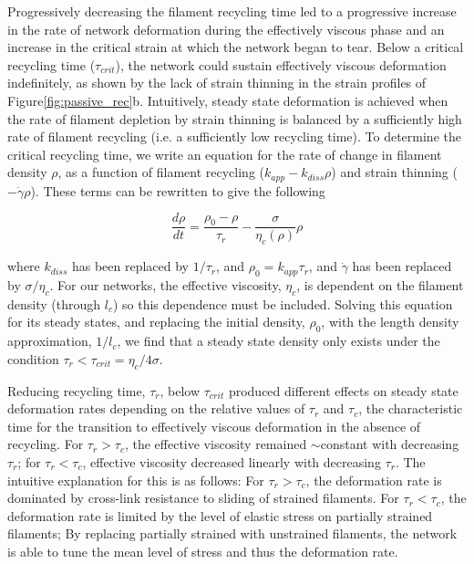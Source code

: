 \documentclass[10pt,letterpaper]{article}
\begin{document}
Progressively decreasing the filament recycling time led to a progressive increase in the rate of network deformation during the effectively viscous phase and an increase in the critical strain at which the network began to tear. Below a critical recycling time ($\tau_{crit}$), the network could sustain effectively viscous deformation indefinitely, as shown by the lack of strain thinning in the strain profiles of Figure\ref{fig:passive_rec}b. Intuitively, steady state deformation is achieved when the rate of filament depletion by strain thinning is balanced by a sufficiently high rate of filament recycling (i.e. a sufficiently low recycling time).  To determine the critical recycling time, we write an equation for the rate of change in filament density $\rho$, as a function of filament recycling ($k_{app}-k_{diss}\rho$) and strain thinning ($-\dot{\gamma}\rho$).
These terms can be rewritten to give the following 

\begin{equation}
\frac{d \rho}{dt} = \frac{\rho_0-\rho}{\tau_r}  - \frac{\sigma}{\eta_c(\rho)} \rho
\end{equation}

where $k_{diss}$  has been replaced by $1/\tau_r$, and $\rho_0 = k_{app}\tau_r$, and $\dot{\gamma}$ has been replaced by $\sigma/\eta_c$.  For our networks, the effective viscosity, $\eta_c$, is dependent on the filament density (through $l_c$) so this dependence must be included. Solving this equation for its steady states, and replacing the initial density, $\rho_0$, with the length density approximation, $1/l_c$, we find that a steady state density only exists under the condition $\tau_r < \tau_{crit}=\eta_c/4\sigma$.  

Reducing recycling time, $\tau_r$, below $\tau_{crit}$ produced different effects on steady state deformation rates depending on the relative values of $\tau_r$ and $\tau_c$, the characteristic time for the transition to effectively viscous deformation in the absence of recycling. For $\tau_r > \tau_c$, the effective viscosity remained $\sim$constant with decreasing $\tau_r$; for $\tau_r < \tau_c$, effective viscosity decreased linearly with decreasing $\tau_r$.  The intuitive explanation for this is as follows: For $\tau_r > \tau_c$, the deformation rate is dominated by cross-link resistance to sliding of strained filaments. For $\tau_r < \tau_c$, the deformation rate is limited by the level of elastic stress on partially strained filaments; By replacing partially strained with unstrained filaments, the network is able to tune the mean level of stress and thus the deformation rate.
\end{document}
